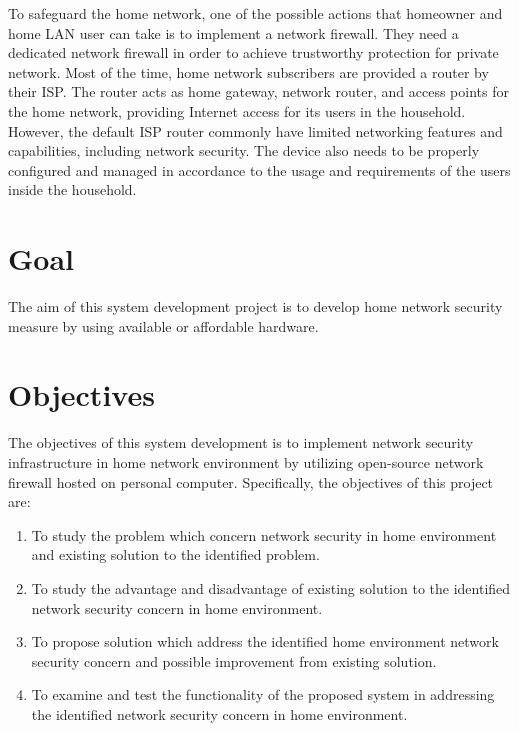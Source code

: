 \documentclass[../index.tex]{subfiles}
\begin{document}
To safeguard the home network, one of the possible actions that homeowner and home LAN user can take
is to implement a network firewall. They need a dedicated network firewall in order to achieve
trustworthy protection for private network. Most of the time, home network subscribers are provided
a router by their ISP. The router acts as home gateway, network router, and access points for the
home network, providing Internet access for its users in the household. However, the default ISP
router commonly have limited networking features and capabilities, including network security. The
device also needs to be properly configured and managed in accordance to the usage and requirements
of the users inside the household.

\section{Goal}

The aim of this system development project is to develop home network security measure by using
available or affordable hardware.

\section{Objectives}

The objectives of this system development is to implement network security infrastructure in home
network environment by utilizing open-source network firewall hosted on personal computer.
Specifically, the objectives of this project are:

\begin{enumerate}


  \item To study the problem which concern network security in home environment and existing
    solution to the identified problem.

  \item To study the advantage and disadvantage of existing solution to the identified network
    security concern in home environment.

  \item To propose solution which address the identified home environment network security concern
    and possible improvement from existing solution.

  \item To examine and test the functionality of the proposed system in addressing the identified
    network security concern in home environment.

\end{enumerate}
\end{document}
